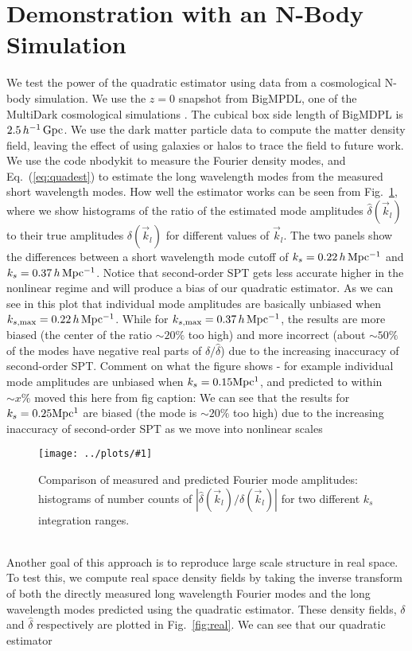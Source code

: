 \documentclass[prd,amsmath,amssymb,floatfix,superscriptaddress,nofootinbib,twocolumn]{revtex4-1}
\newcommand{\vk}{\vec{k}}
\newcommand{\ec}[1]{Eq.~(\ref{eq:#1})}
\newcommand{\rf}[1]{\ref{fig:#1}}
\newcommand{\sfig}[2]{
\texttt{[image: ../plots/\#1]}
        }
\newcommand{\Sfig}[2]{
   \begin{figure}[thbp]
   \begin{center}
    \sfig{../plots/#1.pdf}{\columnwidth}
    \caption{{\small #2}}
    \label{fig:#1}
     \end{center}
   \end{figure}
}
\newcommand{\peikai}[1]{{\color{blue} #1}}
\newcommand{\RC}[1]{{\color{darkorange} #1}}
\begin{document}
\section{Demonstration with an N-Body Simulation}\label{sec3}
We test the power of the quadratic estimator using data from a cosmological N-body simulation. We use the $z=0$ snapshot from BigMPDL, one of the MultiDark cosmological simulations \cite{Klypin:2014nov}. The cubical box side length of BigMDPL is $2.5\,h^{-1}\,\rm Gpc$. We use the dark matter particle data to compute the matter density field, leaving the effect of using galaxies or halos to trace the field \cite{Desjacques:2018rev} to  future work.\\ 
We use the code nbodykit \cite{Hand:2018nby} to measure the Fourier density modes, and \ec{quadest} to estimate the long wavelength modes  from the measured short wavelength modes. How well the estimator works can be seen from Fig.~\rf{hist}, where we show histograms of the ratio of the estimated mode amplitudes $\hat{\delta}(\vk_l)$ to their true amplitudes $\delta(\vk_l)$ \peikai{for different values of $\vk_l$}. The two panels show the differences between a short wavelength mode cutoff of $k_s=0.22\, h\, \rm Mpc^{-1}$ and  $k_s=0.37\,h\, \rm Mpc^{-1}$. \peikai{Notice that second-order SPT gets less accurate higher in the nonlinear regime and will produce a bias of our quadratic estimator. As we can see in this plot that individual mode amplitudes are basically unbiased when $k_{s,\rm max}= 0.22\,h\, \rm Mpc^{-1}$. While for $k_{s,\rm max}=0.37\,h\, \rm Mpc^{-1}$, the results are more biased (the center of the ratio $\sim 20 \%$ too high) and more incorrect (about $\sim 50 \%$ of the modes have negative real parts of $\delta/\hat{\delta}$) due to the increasing inaccuracy of second-order SPT. } \RC{Comment on what the figure shows -  for example individual mode amplitudes are unbiased when $k_s= 0.15 \rm Mpc^{1}$, and predicted to within $\sim x \%$} \RC{moved this here from fig caption: We can see that the results for $k_s=0.25 \rm Mpc^{1}$ are biased (the mode is $\sim 20 \%$ too high) due to the increasing inaccuracy of second-order SPT as we move into nonlinear scales}
\Sfig{hist}{Comparison of measured and predicted Fourier mode amplitudes: histograms of number counts of $|\hat{\delta}(\vk_l)/\delta(\vk_l)|$ for two different $k_s$ integration ranges.}
\\Another goal of this approach is to reproduce large scale structure in real space. To test this, we compute real space density fields by taking the inverse transform of both the directly measured long wavelength Fourier modes and the long wavelength modes predicted using the quadratic estimator. These density fields, $\delta$ and $\hat{\delta}$ respectively are plotted in Fig.~\rf{real}. We can see that \peikai{our quadratic estimator }
\end{document}
